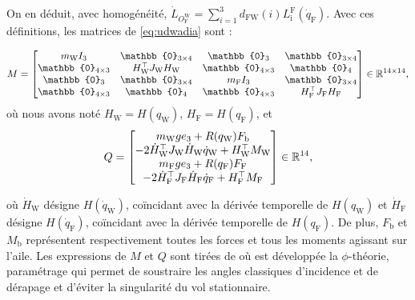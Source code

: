 On en déduit, avec homogénéité, $\dot{L}_{O_{\text{F}}^{\text{W}}} = \sum_{i=1}^{3} d_{\text{FW}}(i) L_{\text{i}}^{\text{F}} (\dot{q}_{\text{F}})$. Avec ces définitions, les matrices de \eqref{eq:udwadia} sont :


\begin{align}
    M = \begin{bmatrix}
        m_{\text{W}} I_{3} & \mathbb{0}_{3 \times 4} & \mathbb{0}_{3} & \mathbb{0}_{3 \times 4}\\
        \mathbb{0}_{4 \times 3} & H_{\text{W}}^\top J_{\text{W}} H_{\text{W}} & \mathbb{0}_{4 \times 3} & \mathbb{0}_{4}\\
        \mathbb{0}_{3} & \mathbb{0}_{3 \times 4} & m_{\text{F}} I_{3} & \mathbb{0}_{3 \times 4} \\
        \mathbb{0}_{4 \times 3} & \mathbb{0}_{4 } & \mathbb{0}_{4 \times 3} & H_{\text{F}}^\top J_{\text{F}} H_{\text{F}}    \end{bmatrix}\in \real^{14\times14},
\end{align}
où nous avons noté $H_{\text{W}} = H(q_{\text{W}})$, $H_{\text{F}} = H(q_{\text{F}})$, et
\begin{align}
    Q = \begin{bmatrix}
            m_{\text{W}} g e_3 + R(q_{\text{W}}) F_{\text{b}}\\
            -2\dot{H}_{\text{W}}^\top J_{\text{W}} \dot{H}_{\text{W}} \dot{q}_{\text{W}} + H_{\text{W}}^\top M_{\text{W}}\\
            m_{\text{F}} g e_3 + R(q_{\text{F}}) F_{\text{F}}\\
            -2\dot{H}_{\text{F}}^\top J_{\text{F}} \dot{H}_{\text{F}} \dot{q}_{\text{F}} + H_{\text{F}}^\top M_{\text{F}}\\
        \end{bmatrix} \in {\mathbb R}^{14},
\end{align}

où $\dot{H}_{\text{W}}$ désigne $H(\dot{q}_{\text{W}})$, coïncidant avec la dérivée temporelle de $H(q_{\text{W}})$ et $\dot{H}_{\text{F}}$ désigne $H(\dot{q}_{\text{F}})$, coïncidant avec la dérivée temporelle de $H(q_{\text{F}})$. De plus, $F_{\text{b}}$ et $M_{\text{b}}$ représentent respectivement toutes les forces et tous les moments agissant sur l'aile. Les expressions de $M$ et $Q$ sont tirées de \cite[équations (45) et (57)]{lustosaHal-03035938} où est développée la $\phi$-théorie, paramétrage qui permet de soustraire les angles classiques d'incidence et de dérapage et d'éviter la singularité du vol stationnaire. 

